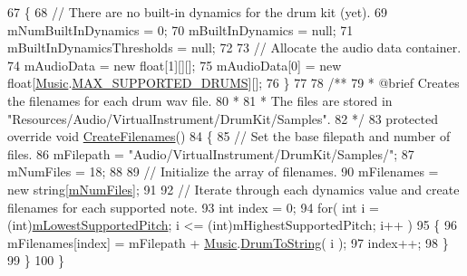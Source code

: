 \begin{DoxyCodeInclude}
67     \{
68         \textcolor{comment}{// There are no built-in dynamics for the drum kit (yet).}
69         mNumBuiltInDynamics = 0;
70         mBuiltInDynamics = null;
71         mBuiltInDynamicsThresholds = null;
72 
73         \textcolor{comment}{// Allocate the audio data container.}
74         mAudioData = \textcolor{keyword}{new} \textcolor{keywordtype}{float}[1][][];
75         mAudioData[0] = \textcolor{keyword}{new} \textcolor{keywordtype}{float}[\hyperlink{class_music}{Music}.\hyperlink{group___music_constants_gabce1a1ac5b9b6355af6bd7fb3868467a}{MAX\_SUPPORTED\_DRUMS}][];
76     \}
77 \textcolor{comment}{}
78 \textcolor{comment}{    /**}
79 \textcolor{comment}{     * @brief Creates the filenames for each drum wav file.}
80 \textcolor{comment}{     * }
81 \textcolor{comment}{     * The files are stored in "Resources/Audio/VirtualInstrument/DrumKit/Samples".}
82 \textcolor{comment}{    */} 
83     \textcolor{keyword}{protected} \textcolor{keyword}{override} \textcolor{keywordtype}{void} \hyperlink{group___drum_virt_func_ga25bb92cf56bc1b3434465faf73cd09cf}{CreateFilenames}()
84     \{
85         \textcolor{comment}{// Set the base filepath and number of files.}
86         mFilepath = \textcolor{stringliteral}{"Audio/VirtualInstrument/DrumKit/Samples/"};
87         mNumFiles = 18;
88 
89         \textcolor{comment}{// Initialize the array of filenames.}
90         mFilenames = \textcolor{keyword}{new} \textcolor{keywordtype}{string}[\hyperlink{group___v_i_base_pro_var_ga9a602db8c9833ce75d95dd453c27d341}{mNumFiles}];
91 
92         \textcolor{comment}{// Iterate through each dynamics value and create filenames for each supported note.}
93         \textcolor{keywordtype}{int} index = 0;
94         \textcolor{keywordflow}{for}( \textcolor{keywordtype}{int} i = (\textcolor{keywordtype}{int})\hyperlink{group___v_i_base_pro_var_ga3cae52b1bcc0178a8a6b03c7aaf7aac8}{mLowestSupportedPitch}; i <= (int)mHighestSupportedPitch; i++
       )
95         \{
96             mFilenames[index] = mFilepath + \hyperlink{class_music}{Music}.\hyperlink{group___music_stat_func_gaf5f64ebe9a7e036e07f283e41f26d22b}{DrumToString}( i );
97             index++;
98         \}
99     \}
100 \}
\end{DoxyCodeInclude}
 